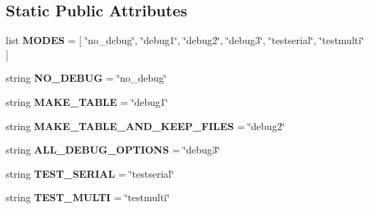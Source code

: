 \subsection*{Static Public Attributes}
\begin{DoxyCompactItemize}
\item 
list {\bfseries M\+O\+D\+ES} = \mbox{[} \char`\"{}no\+\_\+debug\char`\"{}, \char`\"{}debug1\char`\"{}, \char`\"{}debug2\char`\"{}, \char`\"{}debug3\char`\"{}, \char`\"{}testserial\char`\"{}, \char`\"{}testmulti\char`\"{} \mbox{]}\hypertarget{classnegui_1_1pgdriveneestimator_1_1DebugMode_a7f3d898bacc395557b8cb40337cfa7e6}{}\label{classnegui_1_1pgdriveneestimator_1_1DebugMode_a7f3d898bacc395557b8cb40337cfa7e6}

\item 
string {\bfseries N\+O\+\_\+\+D\+E\+B\+UG} = \char`\"{}no\+\_\+debug\char`\"{}\hypertarget{classnegui_1_1pgdriveneestimator_1_1DebugMode_a68f03775793d9894bdb28c34f9b33a0c}{}\label{classnegui_1_1pgdriveneestimator_1_1DebugMode_a68f03775793d9894bdb28c34f9b33a0c}

\item 
string {\bfseries M\+A\+K\+E\+\_\+\+T\+A\+B\+LE} = \char`\"{}debug1\char`\"{}\hypertarget{classnegui_1_1pgdriveneestimator_1_1DebugMode_ad287b36021099229f7f4fc86ebc5774e}{}\label{classnegui_1_1pgdriveneestimator_1_1DebugMode_ad287b36021099229f7f4fc86ebc5774e}

\item 
string {\bfseries M\+A\+K\+E\+\_\+\+T\+A\+B\+L\+E\+\_\+\+A\+N\+D\+\_\+\+K\+E\+E\+P\+\_\+\+F\+I\+L\+ES} = \char`\"{}debug2\char`\"{}\hypertarget{classnegui_1_1pgdriveneestimator_1_1DebugMode_a9fb4c700600776a72a359483a08928ea}{}\label{classnegui_1_1pgdriveneestimator_1_1DebugMode_a9fb4c700600776a72a359483a08928ea}

\item 
string {\bfseries A\+L\+L\+\_\+\+D\+E\+B\+U\+G\+\_\+\+O\+P\+T\+I\+O\+NS} = \char`\"{}debug3\char`\"{}\hypertarget{classnegui_1_1pgdriveneestimator_1_1DebugMode_a9f3faea66935c3978c447de9baf0f144}{}\label{classnegui_1_1pgdriveneestimator_1_1DebugMode_a9f3faea66935c3978c447de9baf0f144}

\item 
string {\bfseries T\+E\+S\+T\+\_\+\+S\+E\+R\+I\+AL} = \char`\"{}testserial\char`\"{}\hypertarget{classnegui_1_1pgdriveneestimator_1_1DebugMode_aec7b522f17d7790b980ae128a4445b0e}{}\label{classnegui_1_1pgdriveneestimator_1_1DebugMode_aec7b522f17d7790b980ae128a4445b0e}

\item 
string {\bfseries T\+E\+S\+T\+\_\+\+M\+U\+L\+TI} = \char`\"{}testmulti\char`\"{}\hypertarget{classnegui_1_1pgdriveneestimator_1_1DebugMode_a8a5f8c6fe20337dd6b894aba21bd1e17}{}\label{classnegui_1_1pgdriveneestimator_1_1DebugMode_a8a5f8c6fe20337dd6b894aba21bd1e17}


\end{DoxyCompactItemize}
